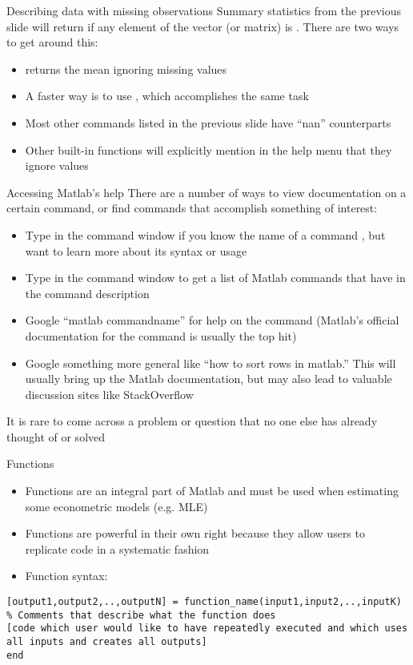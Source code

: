 \documentclass[english,xcolor=dvipsnames]{beamer}
\begin{document}
\begin{frame}[fragile]{Describing data with missing observations}
Summary statistics from the previous slide will return  if any element of the vector (or matrix) is . There are two ways to get around this:
\begin{itemize}
	\item {} returns the mean ignoring missing values
	\item A faster way is to use , which accomplishes the same task
	\item Most other commands listed in the previous slide have ``nan'' counterparts
	\item Other built-in functions will explicitly mention in the help menu that they ignore  values
\end{itemize}
\end{frame}

\begin{frame}[fragile]{Accessing Matlab's help}
There are a number of ways to view documentation on a certain command, or find commands that accomplish something of interest:
\begin{itemize}
	\item Type  in the command window if you know the name of a command , but want to learn more about its syntax or usage
	\item Type  in the command window to get a list of Matlab commands that have  in the command description
	\item Google ``matlab commandname'' for help on the  command (Matlab's official documentation for the command is usually the top hit)
	\item Google something more general like ``how to sort rows in matlab.'' This will usually bring up the Matlab documentation, but may also lead to valuable discussion sites like StackOverflow
\end{itemize}
It is rare to come across a problem or question that no one else has already thought of or solved
\end{frame}

\begin{frame}[fragile]{Functions}
\begin{itemize}
	\item Functions are an integral part of Matlab and must be used when estimating some econometric models (e.g. MLE)
	\item Functions are powerful in their own right because they allow users to replicate code in a systematic fashion
	\item Function syntax:
\end{itemize}
\begin{lstlisting}
[output1,output2,..,outputN] = function_name(input1,input2,..,inputK)
% Comments that describe what the function does
[code which user would like to have repeatedly executed and which uses all inputs and creates all outputs]
end
\end{lstlisting}
\end{frame}
\end{document}
